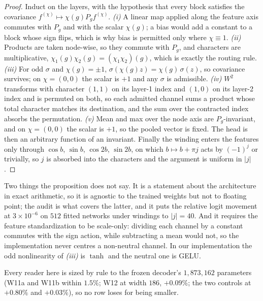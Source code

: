 \documentclass[10pt,twocolumn,letterpaper]{article}
\theoremstyle{definition}
\begin{document}
\begin{proof}
Induct on the layers, with the hypothesis that every block satisfies the covariance
$f^{(\chi)} \mapsto \chi(g) P_g f^{(\chi)}$. \emph{(i)} A linear map applied along the feature
axis commutes with $P_g$ and with the scalar $\chi(g)$; a bias would add a constant to a block whose
sign flips, which is why bias is permitted only where $\chi \equiv 1$. \emph{(ii)} Products are
taken node-wise, so they commute with $P_g$, and characters are multiplicative,
$\chi_1(g)\chi_2(g) = (\chi_1\chi_2)(g)$, which is exactly the routing rule. \emph{(iii)} For odd
$\sigma$ and $\chi(g) = \pm1$, $\sigma(\chi(g) z) = \chi(g)\,\sigma(z)$, so covariance survives;
on $\chi = (0,0)$ the scalar is $+1$ and any $\sigma$ is admissible. \emph{(iv)} $W^2$ transforms
with character $(1,1)$ on its layer-1 index and $(1,0)$ on its layer-2 index and is permuted on both,
so each admitted channel sums a product whose total character matches its destination, and the sum
over the contracted index absorbs the permutation. \emph{(v)} Mean and max over the node axis are
$P_g$-invariant, and on $\chi = (0,0)$ the scalar is $+1$, so the pooled vector is fixed. The head
is then an arbitrary function of an invariant. Finally the winding enters the features only through
$\cos b$, $\sin b$, $\cos 2b$, $\sin 2b$, on which $b \mapsto b + \pi j$ acts by $(-1)^j$ or
trivially, so $j$ is absorbed into the characters and the argument is uniform in $|j|$.
\end{proof}

Two things the proposition does not say. It is a statement about the architecture in exact
arithmetic, so it is agnostic to the trained weights but not to floating point; the audit is what
covers the latter, and it puts the relative logit movement at $3\times10^{-6}$ on $512$ fitted
networks under windings to $|j| = 40$. And it requires the feature standardization to be
scale-only: dividing each channel by a constant commutes with the sign action, while subtracting a
mean would not, so the implementation never centres a non-neutral channel. In our implementation
the odd nonlinearity of \emph{(iii)} is $\tanh$ and the neutral one is GELU.

Every reader here is sized by rule to the frozen decoder's $1{,}873{,}162$ parameters (W11a and
W11b within $1.5\%$; W12 at width $186$, $+0.09\%$; the two controls at $+0.80\%$ and $+0.03\%$),
so no row loses for being smaller.




\end{document}
